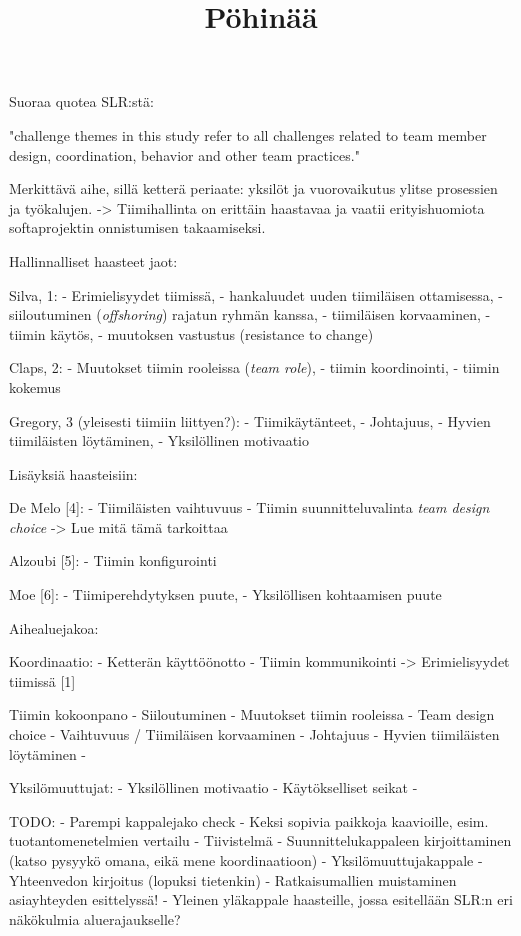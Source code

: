 \title{Pöhinää}

Suoraa quotea SLR:stä: 

"challenge themes in this study refer to all challenges related to team member design, coordination, behavior and other team practices."

Merkittävä aihe, sillä ketterä periaate: yksilöt ja vuorovaikutus ylitse prosessien ja työkalujen.
-> Tiimihallinta on erittäin haastavaa ja vaatii erityishuomiota softaprojektin onnistumisen takaamiseksi.


Hallinnalliset haasteet jaot:

Silva, 1: 
- Erimielisyydet tiimissä, 
- hankaluudet uuden tiimiläisen ottamisessa, 
- siiloutuminen (\textit{offshoring}) rajatun ryhmän kanssa, 
- tiimiläisen korvaaminen, 
- tiimin käytös, 
- muutoksen vastustus (resistance to change)

Claps, 2:
- Muutokset tiimin rooleissa (\textit{team role}), 
- tiimin koordinointi, 
- tiimin kokemus

Gregory, 3 (yleisesti tiimiin liittyen?):
- Tiimikäytänteet,
- Johtajuus,
- Hyvien tiimiläisten löytäminen,
- Yksilöllinen motivaatio


Lisäyksiä haasteisiin:

De Melo [4]:
- Tiimiläisten vaihtuvuus
- Tiimin suunnitteluvalinta \textit{team design choice}
-> Lue mitä tämä tarkoittaa

Alzoubi [5]:
- Tiimin konfigurointi

Moe [6]:
- Tiimiperehdytyksen puute,
- Yksilöllisen kohtaamisen puute


Aihealuejakoa:

Koordinaatio:
- Ketterän käyttöönotto
- Tiimin kommunikointi
-> Erimielisyydet tiimissä [1]

Tiimin kokoonpano
- Siiloutuminen
- Muutokset tiimin rooleissa
- Team design choice
- Vaihtuvuus / Tiimiläisen korvaaminen
- Johtajuus
- Hyvien tiimiläisten löytäminen
- 

Yksilömuuttujat:
- Yksilöllinen motivaatio
- Käytökselliset seikat
- 


TODO:
- Parempi kappalejako check
- Keksi sopivia paikkoja kaavioille, esim. tuotantomenetelmien vertailu
- Tiivistelmä
- Suunnittelukappaleen kirjoittaminen (katso pysyykö omana, eikä mene koordinaatioon)
- Yksilömuuttujakappale
- Yhteenvedon kirjoitus (lopuksi tietenkin)
- Ratkaisumallien muistaminen asiayhteyden esittelyssä!
- Yleinen yläkappale haasteille, jossa esitellään SLR:n eri näkökulmia aluerajaukselle?